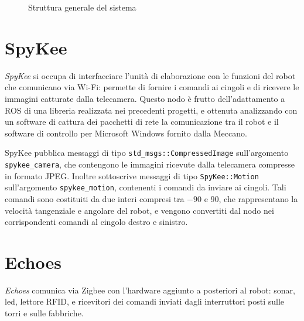 \begin{figure}[h]

\caption{Struttura generale del sistema} 
\label{fig:schemanodi}
\end{figure}

\section{SpyKee}
\emph{SpyKee} si occupa di interfacciare l'unità di elaborazione con le funzioni del robot che comunicano via Wi-Fi: permette di fornire i comandi ai cingoli e di ricevere le immagini catturate dalla telecamera. Questo nodo è frutto dell'adattamento a ROS di una libreria realizzata nei precedenti progetti, e ottenuta analizzando con un software di cattura dei pacchetti di rete la comunicazione tra il robot e il software di controllo per Microsoft Windows fornito dalla Meccano.

SpyKee pubblica messaggi di tipo \verb|std_msgs::CompressedImage| sull'argomento \verb|spykee_camera|, che contengono le immagini ricevute dalla telecamera compresse in formato JPEG. Inoltre sottoscrive messaggi di tipo \verb|SpyKee::Motion| sull'argomento \verb|spykee_motion|, contenenti i comandi da inviare ai cingoli. Tali comandi sono costituiti da due interi compresi tra $-90$ e $90$, che rappresentano la velocità tangenziale e angolare del robot, e vengono convertiti dal nodo nei corrispondenti comandi al cingolo destro e sinistro.

\section{Echoes}
\emph{Echoes} comunica via Zigbee con l'hardware aggiunto a posteriori al robot: sonar, led, lettore RFID, e ricevitori dei comandi inviati dagli interruttori posti sulle torri e sulle fabbriche.

